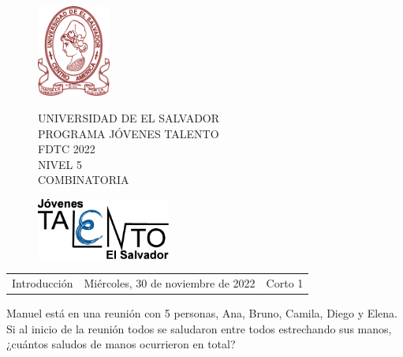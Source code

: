 \documentclass[12pt]{article}
\newcommand{\tema}{Introducción}
\newcommand{\fecha}{Miércoles, 30 de noviembre de 2022}
\newcommand{\sesion}{Corto 1}
\begin{document}
\thispagestyle{empty}

\begin{figure}[h] 
	\begin{minipage}[b]{0.26\textwidth}
		\begin{center}
			\includegraphics[height=3cm]{Logos/UES.png}
			\par\end{center}
	\end{minipage} 
	\begin{minipage}[b]{0.46\textwidth}
		\begin{center}
			UNIVERSIDAD DE EL SALVADOR\\ [0.1cm]
			PROGRAMA JÓVENES TALENTO\\ [0.1cm]
	        FDTC 2022\\ [0.1cm]
                NIVEL 5\\ [0.1cm]
			COMBINATORIA 
			\par\end{center}
	\end{minipage} 
	\begin{minipage}[b]{0.05\textwidth}
		\begin{center}
			\includegraphics[height=2cm]{Logos/LOGO PJT.png}
			\par\end{center}
	\end{minipage}
\end{figure}

\begin{center}
    \begin{tabular}{p{4.5cm} p{7cm} p{4.5cm}}
        \tema & \centering\fecha & \hfill\sesion
    \end{tabular}
\end{center}

\begin{problema}
    Manuel está en una reunión con 5 personas, Ana, Bruno, Camila, Diego y Elena. Si al inicio de la reunión todos se saludaron entre todos estrechando sus manos, ¿cuántos saludos de manos ocurrieron en total?
\end{problema}
\end{document}
